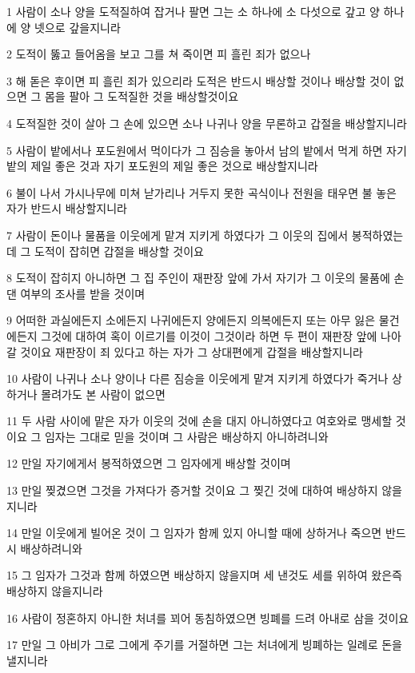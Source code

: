 \par 1 사람이 소나 양을 도적질하여 잡거나 팔면 그는 소 하나에 소 다섯으로 갚고 양 하나에 양 넷으로 갚을지니라
\par 2 도적이 뚫고 들어옴을 보고 그를 쳐 죽이면 피 흘린 죄가 없으나
\par 3 해 돋은 후이면 피 흘린 죄가 있으리라 도적은 반드시 배상할 것이나 배상할 것이 없으면 그 몸을 팔아 그 도적질한 것을 배상할것이요
\par 4 도적질한 것이 살아 그 손에 있으면 소나 나귀나 양을 무론하고 갑절을 배상할지니라
\par 5 사람이 밭에서나 포도원에서 먹이다가 그 짐승을 놓아서 남의 밭에서 먹게 하면 자기 밭의 제일 좋은 것과 자기 포도원의 제일 좋은 것으로 배상할지니라
\par 6 불이 나서 가시나무에 미쳐 낟가리나 거두지 못한 곡식이나 전원을 태우면 불 놓은 자가 반드시 배상할지니라
\par 7 사람이 돈이나 물품을 이웃에게 맡겨 지키게 하였다가 그 이웃의 집에서 봉적하였는데 그 도적이 잡히면 갑절을 배상할 것이요
\par 8 도적이 잡히지 아니하면 그 집 주인이 재판장 앞에 가서 자기가 그 이웃의 물품에 손 댄 여부의 조사를 받을 것이며
\par 9 어떠한 과실에든지 소에든지 나귀에든지 양에든지 의복에든지 또는 아무 잃은 물건에든지 그것에 대하여 혹이 이르기를 이것이 그것이라 하면 두 편이 재판장 앞에 나아갈 것이요 재판장이 죄 있다고 하는 자가 그 상대편에게 갑절을 배상할지니라
\par 10 사람이 나귀나 소나 양이나 다른 짐승을 이웃에게 맡겨 지키게 하였다가 죽거나 상하거나 몰려가도 본 사람이 없으면
\par 11 두 사람 사이에 맡은 자가 이웃의 것에 손을 대지 아니하였다고 여호와로 맹세할 것이요 그 임자는 그대로 믿을 것이며 그 사람은 배상하지 아니하려니와
\par 12 만일 자기에게서 봉적하였으면 그 임자에게 배상할 것이며
\par 13 만일 찢겼으면 그것을 가져다가 증거할 것이요 그 찢긴 것에 대하여 배상하지 않을지니라
\par 14 만일 이웃에게 빌어온 것이 그 임자가 함께 있지 아니할 때에 상하거나 죽으면 반드시 배상하려니와
\par 15 그 임자가 그것과 함께 하였으면 배상하지 않을지며 세 낸것도 세를 위하여 왔은즉 배상하지 않을지니라
\par 16 사람이 정혼하지 아니한 처녀를 꾀어 동침하였으면 빙폐를 드려 아내로 삼을 것이요
\par 17 만일 그 아비가 그로 그에게 주기를 거절하면 그는 처녀에게 빙폐하는 일례로 돈을 낼지니라
